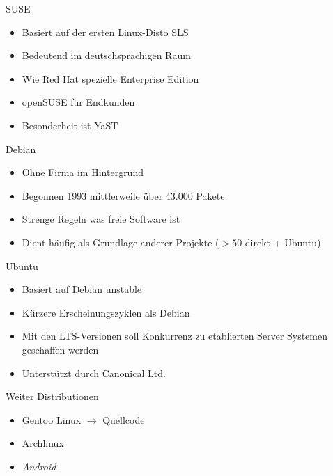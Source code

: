 \documentclass[aspectratio=43]{beamer}
\begin{document}
\begin{frame} 

	\begin{block}{SUSE} 
	\begin{itemize}
	\item Basiert auf der ersten Linux-Disto SLS
	\item Bedeutend im deutschsprachigen Raum
	\item Wie Red Hat spezielle Enterprise Edition
	\item openSUSE für Endkunden
	\item Besonderheit ist YaST
	\end{itemize}
	\end{block}

	\begin{block}{Debian} 
	\begin{itemize}
	\item Ohne Firma im Hintergrund
	\item Begonnen 1993 mittlerweile  über 43.000 Pakete
	\item Strenge Regeln was freie Software ist
	\item Dient häufig als Grundlage anderer Projekte ($>50$ direkt + Ubuntu) 
	\end{itemize}
	\end{block}

	
\end{frame}

\begin{frame} 

	\begin{block}{Ubuntu} 
	\begin{itemize}
	\item Basiert auf Debian unstable
	\item Kürzere Erscheinungszyklen als Debian
	\item Mit den LTS-Versionen soll Konkurrenz zu etablierten Server Systemen geschaffen werden
	\item Unterstützt durch Canonical Ltd.
	\end{itemize}
	\end{block}

	\begin{block}{Weiter Distributionen} 
	\begin{itemize}
	\item Gentoo Linux $\rightarrow$ Quellcode
	\item Archlinux
	\item \textit{Android}
	\end{itemize}
	\end{block}

	
\end{frame}
\end{document}
